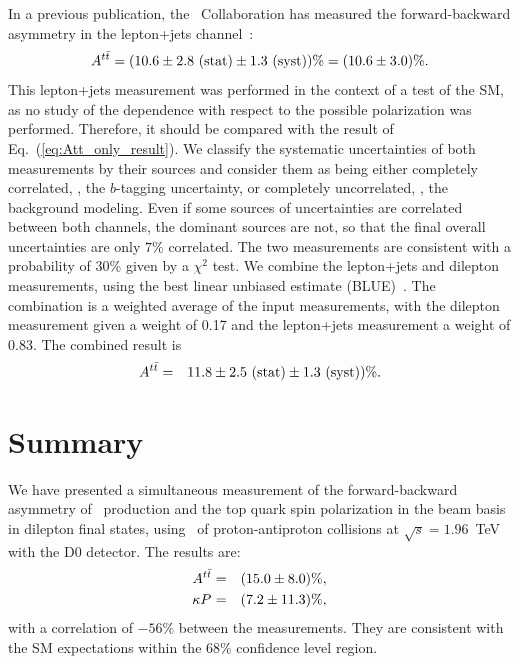 \documentclass[aps,prd,twocolumn,showpacs,superscriptaddress,groupedaddress,floatfix]{revtex4}
\begin{document}
In a previous publication, the \dzero\ Collaboration has measured the forward-backward
asymmetry in the
lepton+jets channel~\cite{Abazov:2014cca}: \begin{equation}
A^{t\bar t} = (10.6\pm 2.8  \text{ (stat)}   \pm 1.3 \text{ (syst)})\%= (10.6\pm3.0)\% .\end{equation}
This lepton+jets measurement  was performed in the context of a test of the SM, as no study of the dependence with respect to the possible polarization was performed. Therefore, it should be compared with the result of Eq.~(\ref{eq:Att_only_result}).
We  classify the systematic uncertainties of both measurements by their sources and consider them as being
either completely correlated, \eg, the $b$-tagging uncertainty, or completely uncorrelated, \eg, the background modeling.
Even if some sources of uncertainties are correlated between both channels, the dominant sources are not, so that the final overall uncertainties are only $7\%$ correlated.
The two measurements are consistent with a  probability of 30\% given by a $\chi^2$ test.
We combine the lepton+jets and dilepton measurements, using the best linear unbiased estimate (BLUE)~\cite{Lyons:1988rp,Valassi:2003mu}.
The combination is a weighted average of the
input measurements, with the dilepton measurement given
a weight of 0.17 and the lepton+jets measurement a weight of 0.83.
The combined result is
\begin{eqnarray}
A^{t\bar t} &=& 11.8 \pm 2.5  \text{ (stat)}   \pm 1.3 \text{ (syst)})\% .
\end{eqnarray}



\section{Summary}


We have presented a simultaneous measurement of
the forward-backward asymmetry of \ttbar\ production and the top quark spin polarization in the beam basis in
dilepton final states, using \lumi\ of
proton-antiproton collisions at $\sqrt{s}=1.96$~TeV with the D0 detector.
The results are:
\begin{eqnarray}
A^{t\bar t} &=& (15.0 \pm 8.0)\%, \label{eq:final_result2}\\
\kappa P^{}_{} &=& (7.2 \pm 11.3)\%, \nonumber
\end{eqnarray}
with a correlation of $-56\%$ between the  measurements. They are consistent with the SM expectations within the 68\% confidence level region.
\end{document}
